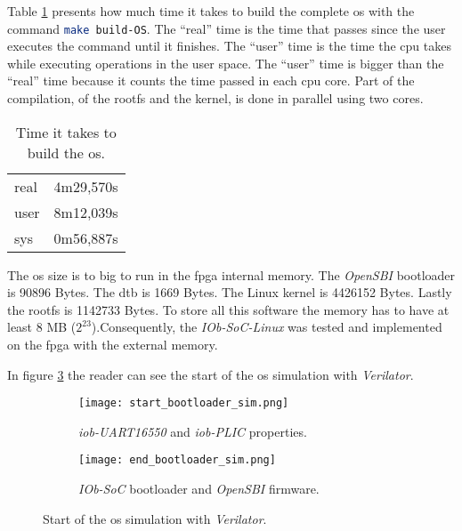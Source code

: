 Table \ref{tab:time_os} presents how much time it takes to build the complete \acrshort{os} with the command \lstinline[language=sh]{make build-OS}. The \enquote{real} time is the time that passes since the user executes the command until it finishes. The \enquote{user} time is the time the \acrshort{cpu} takes while executing operations in the user space. The \enquote{user} time is bigger than the \enquote{real} time because it counts the time passed in each \acrshort{cpu} core. Part of the compilation, of the \acrshort{rootfs} and the kernel, is done in parallel using two cores.

\begin{table}[!ht]
    \centering
    \begin{tabular}{ll}
    real & 4m29,570s \\
    user & 8m12,039s \\
    sys  & 0m56,887s
    \end{tabular}
    \caption{Time it takes to build the \acrshort{os}.}
    \label{tab:time_os}
\end{table}

The \acrshort{os} size is to big to run in the \acrshort{fpga} internal memory. The \textit{OpenSBI} bootloader is 90896 Bytes. The \acrlong{dtb} is 1669 Bytes. The Linux kernel is 4426152 Bytes. Lastly the \acrlong{rootfs} is 1142733 Bytes. To store all this software the memory has to have at least 8 MB ($2^23$).Consequently, the \textit{IOb-SoC-Linux} was tested and implemented on the \acrshort{fpga} with the external memory.

In figure \ref{fig:bootloader_sim} the reader can see the start of the \acrshort{os} simulation with \textit{Verilator}.

\begin{figure}[!ht]
    \centering
    \begin{subfigure}[b]{0.49\textwidth}
        \centering
        \texttt{[image: start\_bootloader\_sim.png]}
        \caption{\textit{iob-UART16550} and \textit{iob-PLIC} properties.}
        \label{fig:start_bootloader_sim}
    \end{subfigure}
    \hfill
    \begin{subfigure}[b]{0.49\textwidth}
        \centering
        \texttt{[image: end\_bootloader\_sim.png]}
        \caption{\textit{IOb-SoC} bootloader and \textit{OpenSBI} firmware.}
        \label{fig:end_bootloader_sim}
    \end{subfigure}
    \caption{Start of the \acrshort{os} simulation with \textit{Verilator}.}
    \label{fig:bootloader_sim}
\end{figure}

